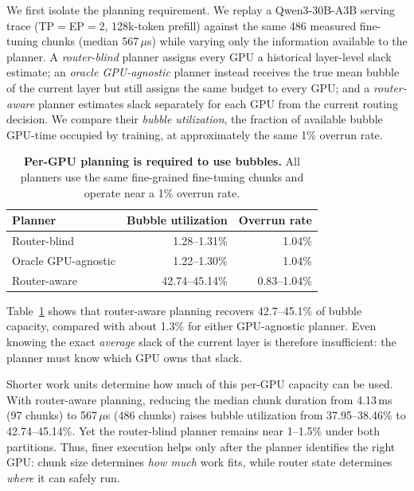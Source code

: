 We first isolate the planning requirement. We replay a
Qwen3-30B-A3B serving trace (\ac{TP}$=$\ac{EP}$=$2, 128k-token
prefill) against the same 486 measured fine-tuning chunks
(median 567\,$\mu$s) while varying only the information available to
the planner. A \emph{router-blind} planner assigns every GPU a
historical layer-level slack estimate; an \emph{oracle GPU-agnostic}
planner instead receives the true mean bubble of the current layer but
still assigns the same budget to every GPU; and a \emph{router-aware}
planner estimates slack separately for each GPU from the current
routing decision. We compare their \emph{bubble utilization}, the
fraction of available bubble GPU-time occupied by training, at
approximately the same 1\% overrun rate.

\begin{table}[t]
  \centering
  \small
  \caption{
    \textbf{Per-GPU planning is required to use bubbles.}
    All planners use the same fine-grained fine-tuning chunks and operate
    near a 1\% overrun rate.}
    
  \label{tab:gap-planner}
  \begin{tabular}{lrr}
    \toprule
    Planner & Bubble utilization & Overrun rate \\
    \midrule
    Router-blind
      & 1.28--1.31\% & 1.04\% \\
    Oracle GPU-agnostic
      & 1.22--1.30\% & 1.04\% \\
    Router-aware
      & 42.74--45.14\% & 0.83--1.04\% \\
    \bottomrule
  \end{tabular}
\end{table}

Table~\ref{tab:gap-planner} shows that router-aware planning recovers
42.7--45.1\% of bubble capacity, compared with about 1.3\% for either
GPU-agnostic planner. Even knowing the exact \emph{average} slack of
the current layer is therefore insufficient: the planner must know
which GPU owns that slack.

Shorter work units determine how much of this per-GPU capacity can be
used. With router-aware planning, reducing the median chunk duration
from 4.13\,ms (97 chunks) to 567\,$\mu$s (486 chunks) raises bubble
utilization from 37.95--38.46\% to 42.74--45.14\%. Yet the
router-blind planner remains near 1--1.5\% under both partitions.
Thus, finer execution helps only after the planner identifies the
right GPU: chunk size determines \emph{how much} work fits, while
router state determines \emph{where} it can safely run.
